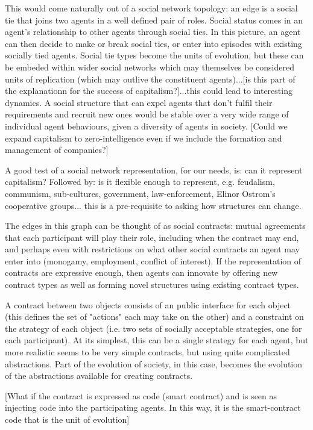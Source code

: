 \documentclass[a4paper]{article}
\begin{document}
This would come naturally out of a social network topology: an edge is a social tie that joins two agents in a well defined pair of roles. Social status comes in an agent's relationship to other agents through social ties. In this picture, an agent can then decide to make or break social ties, or enter into episodes with existing socially tied agents. Social tie types become the units of evolution, but these can be embeded within wider social networks which may themselves be considered units of replication (which may outlive the constituent agents)...[is this part of the explanationn for the success of capitalism?]...this could lead to interesting dynamics. A social structure that can expel agents that don't fulfil their requirements and recruit new ones would be stable over a very wide range of individual agent behaviours, given a diversity of agents in society. [Could we expand capitalism to zero-intelligence even if we include the formation and management of companies?]

A good test of a social network representation, for our needs, is: can it represent capitalism? Followed by: is it flexible enough to represent, e.g. feudalism, communism, sub-cultures, government, law-enforcement, Elinor Ostrom's cooperative groups... this is a pre-requisite to asking how structures can change.  

The edges in this graph can be thought of as social contracts: mutual agreements that each participant will play their role, including when the contract may end, and perhaps even with restrictions on what other social contracts an agent may enter into (monogamy, employment, conflict of interest). If the representation of contracts are expressive enough, then agents can innovate by offering new contract types as well as forming novel structures using existing contract types. 

A contract between two objects consists of an public interface for each object (this defines the set of "actions" each may take on the other) and a constraint on the strategy of each object (i.e. two sets of socially acceptable strategies, one for each participant). At its simplest, this can be a single strategy for each agent, but more realistic seems to be very simple contracts, but using quite complicated abstractions. Part of the evolution of society, in this case, becomes the evolution of the abstractions available for creating contracts.

[What if the contract is expressed as code (smart contract) and is seen as injecting code into the participating agents. In this way, it is the smart-contract code that is the unit of evolution]
\end{document}
